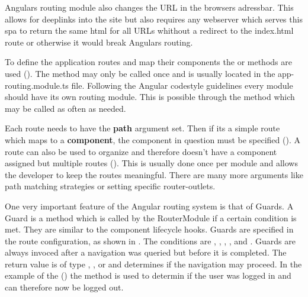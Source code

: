 Angulars routing module also changes the URL in the browsers adressbar. This allows for deeplinks into the site but also requires any webserver which serves this \gls{spa} to return the same \gls{html} for all URLs whithout a redirect to the index.html route or otherwise it would break Angulars routing.


To define the application routes and map their components the  or  methods are used (). The  method may only be called once and is usually located in the app-routing.module.ts file. Following the Angular codestyle guidelines every module should have its own routing module. This is possible through the  method which may be called as often as needed.

Each route needs to have the \textbf{path} argument set. Then if its a simple route which maps to a \textbf{component}, the component in question must be specified (). A route can also be used to organize and therefore doesn't have a component assigned but multiple routes (). This is usually done once per module and allows the developer to keep the routes meaningful. There are many more arguments like path matching strategies or setting specific router-outlets.

One very important feature of the Angular routing system is that of Guards. A Guard is a method which is called by the RouterModule if a certain condition is met. They are similar to the component lifecycle hooks. Guards are specified in the route configuration, as shown in . The conditions are , , , , and . Guards are always invoced after a navigation was queried but before it is completed. The return value is of type , , or  and determines if the navigation may proceed. In the example of the  () the  method is used to determin if the user was logged in and can therefore now be logged out.


